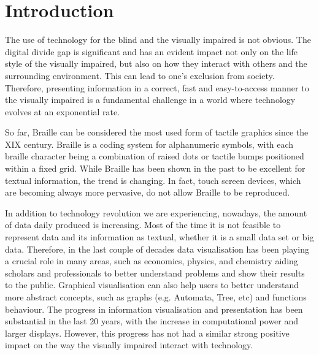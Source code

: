 \chapter{Introduction}
The use of technology for the blind and the visually impaired is not obvious. The digital divide gap is significant and has an evident impact not only on the life style of the visually impaired, but also on how they interact with others and the surrounding environment. This can lead to one's exclusion from society. Therefore, presenting information in a correct, fast and easy-to-access manner to the visually impaired is a fundamental challenge in a world where technology evolves at an exponential rate. \par

So far, Braille can be considered the most used form of tactile graphics since the XIX century\cite{andrea2009history}. Braille is a coding system for alphanumeric symbols, with each braille character being a combination of raised dots or tactile bumps positioned within a fixed grid. While Braille has been shown in the past to be excellent for textual information, the trend is changing. In fact, touch screen devices, which are becoming always more pervasive, do not allow Braille to be reproduced. \par

In addition to technology revolution we are experiencing, nowadays, the amount of data  daily produced is increasing. Most of the time it is not feasible to represent data and its information as textual, whether it is a small data set or big data. Therefore, in the last couple of decades data visualisation has been playing a crucial role in many areas, such as economics, physics, and chemistry aiding scholars and professionals to better understand problems and show their results to the public. Graphical visualisation can also help users to better understand more abstract concepts, such as graphs (e.g. Automata, Tree, etc) and functions behaviour. 
The progress in information visualisation and presentation has been substantial in the last 20 years, with the increase in computational power and larger displays. However, this progress has not had a similar strong positive impact on the way the visually impaired interact with technology. \par 

